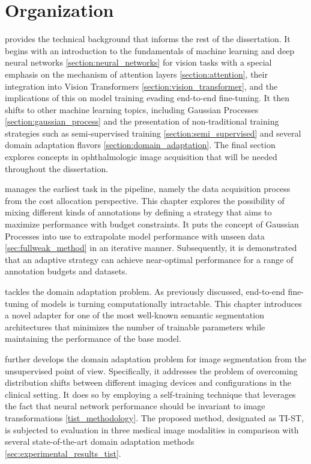 \section{Organization}
 provides the technical background that informs the rest of the dissertation. It begins with an introduction to the fundamentals of machine learning and deep neural networks \cref{section:neural_networks} for vision tasks with a special emphasis on the mechanism of attention layers \cref{section:attention}, their integration into Vision Transformers \cref{section:vision_transformer}, and the implications of this on model training evading end-to-end fine-tuning. It then shifts to other machine learning topics, including Gaussian Processes \cref{section:gaussian_process} and the presentation of non-traditional training strategies such as semi-supervised training \cref{section:semi_supervised} and several domain adaptation flavors \cref{section:domain_adaptation}. The final section explores concepts in ophthalmologic image acquisition that will be needed throughout the dissertation.

 manages the earliest task in the pipeline, namely the data acquisition process from the cost allocation perspective. This chapter explores the possibility of mixing different kinds of annotations by defining a strategy that aims to maximize performance with budget constraints. It puts the concept of Gaussian Processes into use to extrapolate model performance with unseen data \cref{sec:fullweak_method} in an iterative manner. Subsequently, it is demonstrated that an adaptive strategy can achieve near-optimal performance for a range of annotation budgets and datasets.

 tackles the domain adaptation problem. As previously discussed, end-to-end fine-tuning of models is turning computationally intractable. This chapter introduces a novel adapter for one of the most well-known semantic segmentation architectures that minimizes the number of trainable parameters while maintaining the performance of the base model. 

 further develops the domain adaptation problem for image segmentation from the unsupervised point of view. Specifically, it addresses the problem of overcoming distribution shifts between different imaging devices and configurations in the clinical setting. It does so by employing a self-training technique that leverages the fact that neural network performance should be invariant to image transformations \cref{tist_methodology}. The proposed method, designated as TI-ST, is subjected to evaluation in three medical image modalities in comparison with several state-of-the-art domain adaptation methods \cref{sec:experimental_results_tist}.

